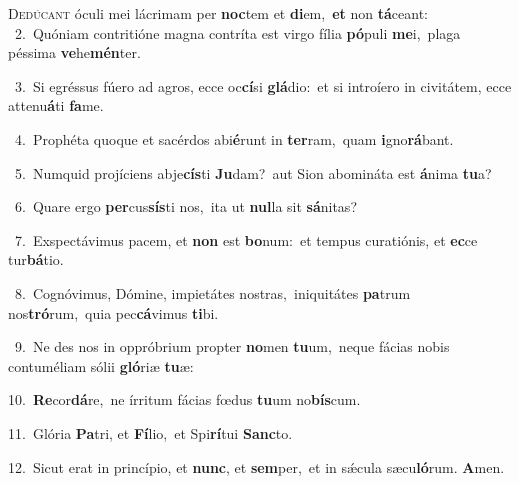 \lettrine{\initial\textcolor{\initialcolor}{D}}{edúcant} óculi mei lácrimam per \textbf{noc}\-tem et \textbf{di}\-em,~\star \textbf{et} non \textbf{tá}\-ceant:\\
{\numbfont\textcolor{\numbcolor}{~2.}}~Quóniam contritióne magna contríta est virgo fília \textbf{pó}\-puli \textbf{me}\-i,~\star plaga péssima \textbf{ve}\-he\-\textbf{mén}\-ter.\par
{\numbfont\textcolor{\numbcolor}{~3.}}~Si egréssus fúero ad agros, ecce oc\-\textbf{cí}\-si \textbf{glá}\-dio:~\star et si introíero in civitátem, ecce attenu\-\textbf{á}\-ti \textbf{fa}\-me.\par
{\numbfont\textcolor{\numbcolor}{~4.}}~Prophéta quoque et sacérdos abi\-\textbf{é}\-runt in \textbf{ter}\-ram,~\star quam \textbf{i}\-gno\-\textbf{rá}\-bant.\par
{\numbfont\textcolor{\numbcolor}{~5.}}~Numquid projíciens abje\-\textbf{cís}\-ti \textbf{Ju}\-dam?~\star aut Sion abomináta est \textbf{á}\-nima \textbf{tu}\-a?\par
{\numbfont\textcolor{\numbcolor}{~6.}}~Quare ergo \textbf{per}\-cus\-\textbf{sís}\-ti nos,~\star ita ut \textbf{nul}\-la sit \textbf{sá}\-nitas?\par
{\numbfont\textcolor{\numbcolor}{~7.}}~Exspectávimus pacem, et \textbf{non} est \textbf{bo}\-num:~\star et tempus curatiónis, et \textbf{ec}\-ce tur\-\textbf{bá}\-tio.\par
{\numbfont\textcolor{\numbcolor}{~8.}}~Cognóvimus, Dómine, impietátes nostras,~\dagger iniquitátes \textbf{pa}\-trum nos\-\textbf{tró}\-rum,~\star quia pec\-\textbf{cá}\-vimus \textbf{ti}\-bi.\par
{\numbfont\textcolor{\numbcolor}{~9.}}~Ne des nos in oppróbrium propter \textbf{no}\-men \textbf{tu}\-um,~\star neque fácias nobis contuméliam sólii \textbf{gló}\-riæ \textbf{tu}\-æ:\par
{\numbfont\textcolor{\numbcolor}{10.}}~\-\textbf{Re}\-cor\-\textbf{dá}\-re,~\star ne írritum fácias fœdus \textbf{tu}\-um no\-\textbf{bís}\-cum.\par
{\numbfont\textcolor{\numbcolor}{11.}}~Glória \textbf{Pa}\-tri, et \textbf{Fí}\-lio,~\star et Spi\-\textbf{rí}\-tui \textbf{Sanc}\-to.\par
{\numbfont\textcolor{\numbcolor}{12.}}~Sicut erat in princípio, et \textbf{nunc}\-, et \textbf{sem}\-per,~\star et in sǽcula sæcu\-\textbf{ló}\-rum. \textbf{A}\-men.\par
